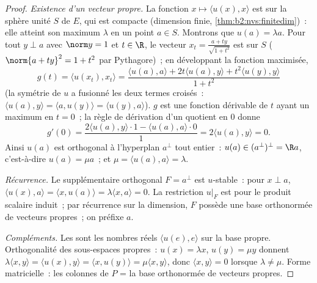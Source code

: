 \begin{proof}
\emph{Existence d'un vecteur propre.} La fonction $x \mapsto \langle
u(x), x\rangle$ est  sur la sphère unité $S$ de $E$, qui est
compacte (dimension finie, \cref{thm:b2:nvs:finitedim})~: elle
atteint son maximum $\lambda$ en un point $a \in S$. Montrons que
$u(a) = \lambda a$. Pour tout $y \perp a$ avec $\norm y = 1$ et $t
\in \R$, le vecteur $x_t = \frac{a + ty}{\sqrt{1 + t^2}}$ est sur
$S$ ($\norm{a + ty}^2 = 1 + t^2$ par Pythagore)~; en développant la
fonction maximisée,
\[
g(t) = \langle u(x_t), x_t\rangle
= \frac{\langle u(a), a\rangle + 2t\langle u(a), y\rangle +
t^2\langle u(y), y\rangle}{1 + t^2}
\]
(la symétrie de $u$ a fusionné les deux termes croisés~: $\langle
u(a), y\rangle = \langle a, u(y)\rangle = \langle u(y), a\rangle$).
$g$ est une fonction dérivable de $t$ ayant un maximum en $t = 0$~;
la règle de dérivation d'un quotient en $0$ donne
\[
g'(0) = \frac{2\langle u(a), y\rangle\cdot 1 - \langle u(a),
a\rangle\cdot 0}{1} = 2\langle u(a), y\rangle = 0 .
\]
Ainsi $u(a)$ est orthogonal à l'hyperplan $a^\perp$ tout entier~:
$u(a) \in (a^{\perp})^{\perp} = \R a$, c'est-à-dire $u(a) = \mu a$~;
et $\mu = \langle u(a), a\rangle = \lambda$.

\emph{Récurrence.} Le supplémentaire orthogonal $F = a^\perp$ est
$u$-stable~: pour $x \perp a$, $\langle u(x), a\rangle = \langle x,
u(a)\rangle = \lambda\langle x, a\rangle = 0$. La restriction
$u|_F$ est  pour le produit scalaire induit~; par
récurrence sur la dimension, $F$ possède une base orthonormée de
vecteurs propres~; on préfixe $a$.

\emph{Compléments.} Les  sont les nombres réels
$\langle u(e), e\rangle$ sur la base propre. Orthogonalité des
sous-espaces propres~: $u(x) = \lambda x$, $u(y) = \mu y$ donnent
$\lambda\langle x, y\rangle = \langle u(x), y\rangle = \langle x,
u(y)\rangle = \mu\langle x, y\rangle$, donc $\langle x, y\rangle =
0$ lorsque $\lambda \neq \mu$. Forme matricielle~: les colonnes de
$P$ = la base orthonormée de vecteurs propres.
\end{proof}

